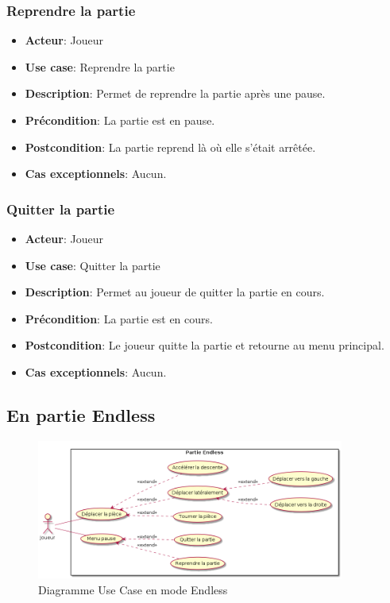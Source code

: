 \documentclass{article}
\begin{document}
\subsubsection*{Reprendre la partie}
\begin{itemize}
    \item \textbf{Acteur}: Joueur
    \item \textbf{Use case}: Reprendre la partie
    \item \textbf{Description}: Permet de reprendre la partie après une pause.
    \item \textbf{Précondition}: La partie est en pause.
    \item \textbf{Postcondition}: La partie reprend là où elle s'était arrêtée.
    \item \textbf{Cas exceptionnels}: Aucun.
\end{itemize}

\subsubsection*{Quitter la partie}
\begin{itemize}
    \item \textbf{Acteur}: Joueur
    \item \textbf{Use case}: Quitter la partie
    \item \textbf{Description}: Permet au joueur de quitter la partie en cours.
    \item \textbf{Précondition}: La partie est en cours.
    \item \textbf{Postcondition}: Le joueur quitte la partie et retourne au menu principal.
    \item \textbf{Cas exceptionnels}: Aucun.
\end{itemize}

\subsection{En partie Endless}

\begin{figure}
    \centering
    \includegraphics[width=0.9\textwidth]{./uml/usescase/en-jeu/endless.png}
    \caption{Diagramme Use Case en mode Endless}
    \label{fig:Endless}
\end{figure}
\end{document}
